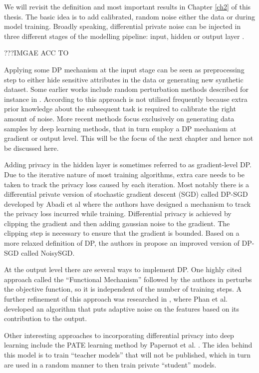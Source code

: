 We will revisit the definition and most important results in Chapter \ref{ch2} of this thesis. The basic idea is to add calibrated, random noise either the data or during model training. Broadly speaking, differential private noise can be injected in three different stages of the modelling pipeline: input, hidden or output layer \parencite[cf.][]{zhao2019differential}. 

???IMGAE ACC TO \parencite{wang2023differential}

Applying some DP mechanism at the input stage can be seen as preprocessing step to either hide sensitive attributes in the data or generating new synthetic dataset. Some earlier works include random perturbation methods described for instance in \parencite{input_levelDP,erm_dp_input}. According to \parencite{wang2023differential} this approach is not utilised frequently because extra prior knowledge about the subsequent task is required to calibrate the right amount of noise. More recent methods focus exclusively on generating data samples by deep learning methods, that in turn employ a DP mechanism at gradient or output level. This will be the focus of the next chapter and hence not be discussed here.

Adding privacy in the hidden layer is sometimes referred to as gradient-level DP. Due to the iterative nature of most training algorithms, extra care needs to be taken to track the privacy loss caused by each iteration. Most notably there is a differential private version of stochastic gradient descent (SGD) called DP-SGD developed by Abadi et al \parencite{Abadi_2016} where the authors have designed a mechanism to track the privacy loss incurred while training. Differential privacy is achieved by clipping the gradient and then adding gaussian noise to the gradient. The clipping step is necessary to ensure that the gradient is bounded. Based on a more relaxed definition of DP, the authors in \parencite{bu2020deep} propose an improved version of DP-SGD called NoisySGD. 

At the output level there are several ways to implement DP. One highly cited approach called the ``Functional Mechanism'' followed by the authors in \parencite{zhang2012functional} perturbs the objective function, so it is independent of the number of training steps. A further refinement of this approach was researched in \parencite{adlm2017}, where Phan et al. developed an algorithm that puts adaptive noise on the features based on its contribution to the output.

Other interesting approaches to incorporating differential privacy into deep learning include the PATE learning method by Papernot et al. \parencite{papernot2017semisupervised}. The idea behind this model is to train ``teacher models'' that will not be published, which in turn are used in a random manner to then train private ``student'' models. 

